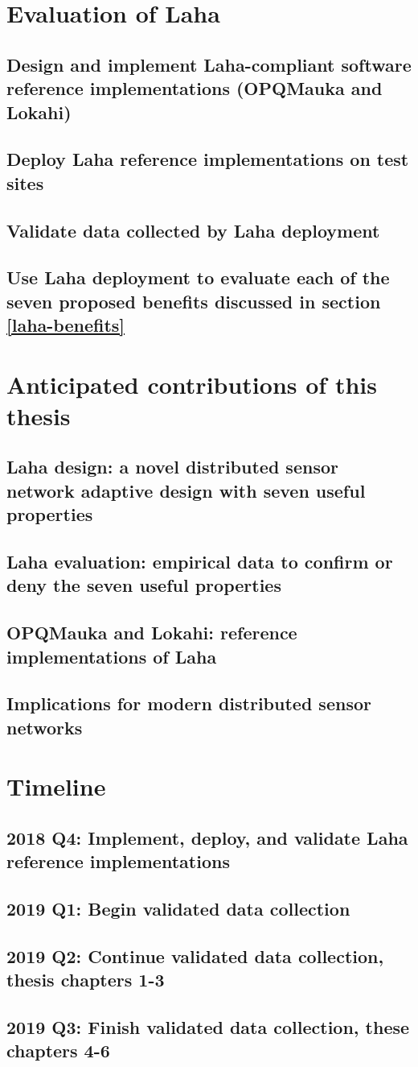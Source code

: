 \section{Evaluation of Laha}
\subsection{Design and implement Laha-compliant software reference implementations (OPQMauka and Lokahi)}
\subsection{Deploy Laha reference implementations on test sites}
\subsection{Validate data collected by Laha deployment}
\subsection{Use Laha deployment to evaluate each of the seven proposed benefits discussed in section \ref{laha-benefits}}

\section{Anticipated contributions of this thesis}
\subsection{Laha design: a novel distributed sensor network adaptive design with seven useful properties}
\subsection{Laha evaluation: empirical data to confirm or deny the seven useful properties}
\subsection{OPQMauka and Lokahi: reference implementations of Laha}
\subsection{Implications for modern distributed sensor networks}

\section{Timeline}
\subsection{2018 Q4: Implement, deploy, and validate Laha reference implementations}
\subsection{2019 Q1: Begin validated data collection}
\subsection{2019 Q2: Continue validated data collection, thesis chapters 1-3}
\subsection{2019 Q3: Finish validated data collection, these chapters 4-6}





